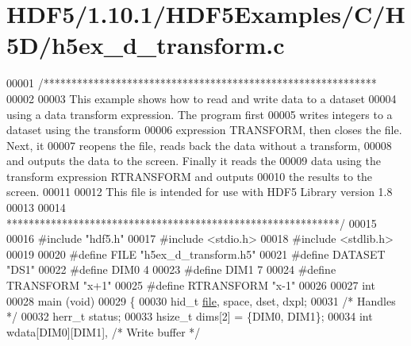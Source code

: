 \hypertarget{_h_d_f5_21_810_81_2_h_d_f5_examples_2_c_2_h5_d_2h5ex__d__transform_8c_source}{}\section{H\+D\+F5/1.10.1/\+H\+D\+F5\+Examples/\+C/\+H5\+D/h5ex\+\_\+d\+\_\+transform.c}
\label{_h_d_f5_21_810_81_2_h_d_f5_examples_2_c_2_h5_d_2h5ex__d__transform_8c_source}

\begin{DoxyCode}
00001 \textcolor{comment}{/************************************************************}
00002 \textcolor{comment}{}
00003 \textcolor{comment}{  This example shows how to read and write data to a dataset}
00004 \textcolor{comment}{  using a data transform expression.  The program first}
00005 \textcolor{comment}{  writes integers to a dataset using the transform}
00006 \textcolor{comment}{  expression TRANSFORM, then closes the file.  Next, it}
00007 \textcolor{comment}{  reopens the file, reads back the data without a transform,}
00008 \textcolor{comment}{  and outputs the data to the screen.  Finally it reads the}
00009 \textcolor{comment}{  data using the transform expression RTRANSFORM and outputs}
00010 \textcolor{comment}{  the results to the screen.}
00011 \textcolor{comment}{}
00012 \textcolor{comment}{  This file is intended for use with HDF5 Library version 1.8}
00013 \textcolor{comment}{}
00014 \textcolor{comment}{ ************************************************************/}
00015 
00016 \textcolor{preprocessor}{#include "hdf5.h"}
00017 \textcolor{preprocessor}{#include <stdio.h>}
00018 \textcolor{preprocessor}{#include <stdlib.h>}
00019 
00020 \textcolor{preprocessor}{#define FILE            "h5ex\_d\_transform.h5"}
00021 \textcolor{preprocessor}{#define DATASET         "DS1"}
00022 \textcolor{preprocessor}{#define DIM0            4}
00023 \textcolor{preprocessor}{#define DIM1            7}
00024 \textcolor{preprocessor}{#define TRANSFORM       "x+1"}
00025 \textcolor{preprocessor}{#define RTRANSFORM      "x-1"}
00026 
00027 \textcolor{keywordtype}{int}
00028 main (\textcolor{keywordtype}{void})
00029 \{
00030     hid\_t           \hyperlink{structfile}{file}, space, dset, dxpl;
00031                                                 \textcolor{comment}{/* Handles */}
00032     herr\_t          status;
00033     hsize\_t         dims[2] = \{DIM0, DIM1\};
00034     \textcolor{keywordtype}{int}             wdata[DIM0][DIM1],          \textcolor{comment}{/* Write buffer */}

\end{DoxyCode}
